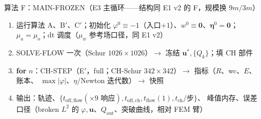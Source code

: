 \documentclass[11pt]{article}
\newcommand{\kwd}[1]{\textbf{#1}}
\newenvironment{pseudo}[1]{\begin{algobox}{#1}%
  \begin{enumerate}[label={\ttfamily\arabic*}, leftmargin=3.4em, itemsep=1.5pt, topsep=1pt, parsep=0pt]}%
  {\end{enumerate}\end{algobox}}
\begin{document}
\begin{pseudo}{算法 F：MAIN-FROZEN（E3 主循环——结构同 E1 v2 的 F，规模换 $9m/3m$）}
\item 运行算法 A、B$'$、C$'$；初始化 $\varphi^0\equiv-1$（入口$+1$）、$w^0\equiv\bm 0$、$\bm\eta^0=\bm 0$；
$\mu_a=\mu_o$；dt 调度（$\mu_w$ 参考场口径，同 E1 v2）
\item SOLVE-FLOW 一次（Schur $1026\times1026$）$\to$ 冻结 $\bm u^{*},\{Q_k\}$；填 CH 部件
\item \kwd{for} $n$：CH-STEP（E$'$，full；CH-Schur $342\times342$）$\to$ 指标（$R$、wc、$E$、账本、
$\max|\varphi|$、$\eta$/Newton 迭代数）$\to$ 快照
\item 输出：轨迹、$\{t_{\mathrm{off,flow}}(\times9\text{ 响应}),t_{\mathrm{off,ch}},t_{\mathrm{flow}}(1),t_{\mathrm{ch}}/\text{步}\}$、
峰值内存、误差口径（broken $L^2$ 的 $\varphi,\bm u$、$Q_{\mathrm{out}}$、突破曲线，相对 FEM 臂）
\end{pseudo}
\end{document}

